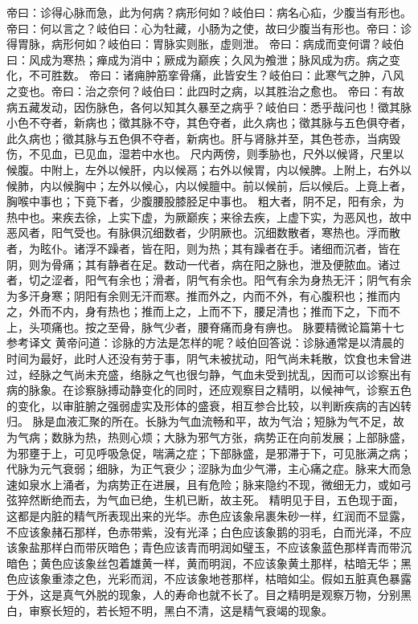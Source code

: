 \documentclass[a4paper,12pt,UTF8,twoside]{ctexbook}
\begin{document}
帝曰：诊得心脉而急，此为何病？病形何如？岐伯曰：病名心疝，少腹当有形也。帝曰：何以言之？岐伯曰：心为牡藏，小肠为之使，故曰少腹当有形也。帝曰：诊得胃脉，病形何如？岐伯曰：胃脉实则胀，虚则泄。
帝曰：病成而变何谓？岐伯曰：风成为寒热；瘅成为消中；厥成为巅疾；久风为飧泄；脉风成为疠。病之变化，不可胜数。
帝曰：诸痈肿筋挛骨痛，此皆安生？岐伯曰：此寒气之肿，八风之变也。帝曰：治之奈何？岐伯曰：此四时之病，以其胜治之愈也。
帝曰：有故病五藏发动，因伤脉色，各何以知其久暴至之病乎？岐伯曰：悉乎哉问也！徵其脉小色不夺者，新病也；徵其脉不夺，其色夺者，此久病也；徵其脉与五色俱夺者，此久病也；徵其脉与五色俱不夺者，新病也。肝与肾脉并至，其色苍赤，当病毁伤，不见血，已见血，湿若中水也。
尺内两傍，则季胁也，尺外以候肾，尺里以候腹。中附上，左外以候肝，内以候鬲；右外以候胃，内以候脾。上附上，右外以候肺，内以候胸中；左外以候心，内以候膻中。前以候前，后以候后。上竟上者，胸喉中事也；下竟下者，少腹腰股膝胫足中事也。
粗大者，阴不足，阳有余，为热中也。来疾去徐，上实下虚，为厥巅疾；来徐去疾，上虚下实，为恶风也，故中恶风者，阳气受也。有脉俱沉细数者，少阴厥也。沉细数散者，寒热也。浮而散者，为眩仆。诸浮不躁者，皆在阳，则为热；其有躁者在手。诸细而沉者，皆在阴，则为骨痛；其有静者在足。数动一代者，病在阳之脉也，泄及便脓血。诸过者，切之涩者，阳气有余也；滑者，阴气有余也。阳气有余为身热无汗；阴气有余为多汗身寒；阴阳有余则无汗而寒。推而外之，内而不外，有心腹积也；推而内之，外而不内，身有热也；推而上之，上而不下，腰足清也；推而下之，下而不上，头项痛也。按之至骨，脉气少者，腰脊痛而身有痹也。
脉要精微论篇第十七参考译文
黄帝问道：诊脉的方法是怎样的呢？岐伯回答说：诊脉通常是以清晨的时间为最好，此时人还没有劳于事，阴气未被扰动，阳气尚未耗散，饮食也未曾进过，经脉之气尚未充盛，络脉之气也很匀静，气血未受到扰乱，因而可以诊察出有病的脉象。在诊察脉搏动静变化的同时，还应观察目之精明，以候神气，诊察五色的变化，以审脏腑之强弱虚实及形体的盛衰，相互参合比较，以判断疾病的吉凶转归。
脉是血液汇聚的所在。长脉为气血流畅和平，故为气治；短脉为气不足，故为气病；数脉为热，热则心烦；大脉为邪气方张，病势正在向前发展；上部脉盛，为邪壅于上，可见呼吸急促，喘满之症；下部脉盛，是邪滞于下，可见胀满之病；代脉为元气衰弱；细脉，为正气衰少；涩脉为血少气滞，主心痛之症。脉来大而急速如泉水上涌者，为病势正在进展，且有危险；脉来隐约不现，微细无力，或如弓弦猝然断绝而去，为气血已绝，生机已断，故主死。
精明见于目，五色现于面，这都是内脏的精气所表现出来的光华。赤色应该象帛裹朱砂一样，红润而不显露，不应该象赭石那样，色赤带紫，没有光泽；白色应该象鹅的羽毛，白而光泽，不应该象盐那样白而带灰暗色；青色应该青而明润如璧玉，不应该象蓝色那样青而带沉暗色；黄色应该象丝包着雄黄一样，黄而明润，不应该象黄土那样，枯暗无华；黑色应该象重漆之色，光彩而润，不应该象地苍那样，枯暗如尘。假如五脏真色暴露于外，这是真气外脱的现象，人的寿命也就不长了。目之精明是观察万物，分别黑白，审察长短的，若长短不明，黑白不清，这是精气衰竭的现象。
\end{document}
